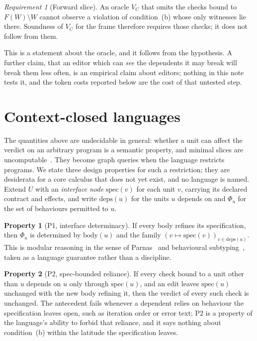 \documentclass[10pt]{article}
\theoremstyle{definition}
\newtheorem{property}{Property}
\theoremstyle{plain}
\theoremstyle{remark}
\newtheorem{requirement}{Requirement}
\begin{document}
\begin{requirement}[Forward slice]
An oracle $V_C$ that omits the checks bound to $F(W) \setminus W$ cannot observe a violation of condition~(b) whose only witnesses lie there. Soundness of $V_C$ for the frame therefore requires those checks; it does not follow from them.
\end{requirement}

This is a statement about the oracle, and it follows from the hypothesis. A further claim, that an editor which can \emph{see} the dependents it may break will break them less often, is an empirical claim about editors; nothing in this note tests it, and the token costs reported below are the cost of that untested step.

\section{Context-closed languages}\label{sec:closed}

The quantities above are undecidable in general: whether a unit can affect the verdict on an arbitrary program is a semantic property, and minimal slices are uncomputable~\cite{weiser1984}. They become graph queries when the language restricts programs. We state three design properties for such a restriction; they are desiderata for a core calculus that does not yet exist, and no language is named. Extend $U$ with an \emph{interface node} $\mathrm{spec}(v)$ for each unit $v$, carrying its declared contract and effects, and write $\mathrm{deps}(u)$ for the units $u$ depends on and $\Phi_u$ for the set of behaviours permitted to $u$.

\begin{property}[P1, interface determinacy]
If every body refines its specification, then $\Phi_u$ is determined by $\mathrm{body}(u)$ and the family $(v \mapsto \mathrm{spec}(v))_{v \in \mathrm{deps}(u)}$. This is modular reasoning in the sense of Parnas~\cite{parnas1972criteria} and behavioural subtyping~\cite{liskov1994behavioral}, taken as a language guarantee rather than a discipline.
\end{property}

\begin{property}[P2, spec-bounded reliance]
If every check bound to a unit other than $u$ depends on $u$ only through $\mathrm{spec}(u)$, and an edit leaves $\mathrm{spec}(u)$ unchanged with the new body refining it, then the verdict of every such check is unchanged. The antecedent fails whenever a dependent relies on behaviour the specification leaves open, such as iteration order or error text; P2 is a property of the language's ability to forbid that reliance, and it says nothing about condition~(b) within the latitude the specification leaves.
\end{property}
\end{document}
